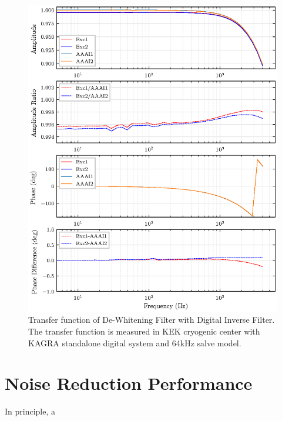 \begin{figure}[bt]
\centering
\includegraphics[width=1\textwidth]{figure/tf/TF_KEK_64}
\caption[Transfer function of De-Whitening Filter with Digital Inverse Filter]{Transfer function of De-Whitening Filter with Digital Inverse Filter. The transfer function is measured in KEK cryogenic center with KAGRA standalone digital system and 64kHz salve model.}\label{fig:tf64}
\end{figure}


\section{Noise Reduction Performance}
In principle, a 

